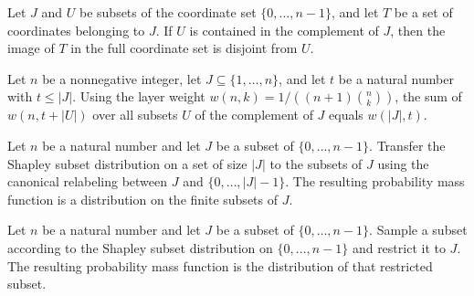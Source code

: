 \begin{theorem}
\label{FABL.disjoint_liftSubsetFrom_of_subset_compl}
\leanok
{}
Let $J$ and $U$ be subsets of the coordinate set $\{0,\ldots,n-1\}$, and let $T$ be a
set of coordinates belonging to $J$. If $U$ is contained in the complement of $J$, then
the image of $T$ in the full coordinate set is disjoint from $U$.
\end{theorem}

\begin{theorem}
\label{FABL.sum_shapleyLayerWeight_add_card_compl}
\leanok
{}
Let $n$ be a nonnegative integer, let $J\subseteq\{1,\ldots,n\}$, and let $t$ be a
natural number with $t\le |J|$. Using the layer weight $w(n,k)=1/((n+1)\binom{n}{k})$,
the sum of $w(n,t+|U|)$ over all subsets $U$ of the complement of $J$ equals $w(|J|,t)$.
\end{theorem}

\begin{definition}
\label{FABL.shapleySubsetPMFOn}
\leanok
{}
Let $n$ be a natural number and let $J$ be a subset of $\{0,\ldots,n-1\}$. Transfer the
Shapley subset distribution on a set of size $|J|$ to the subsets of $J$ using the
canonical relabeling between $J$ and $\{0,\ldots,|J|-1\}$. The resulting probability
mass function is a distribution on the finite subsets of $J$.
\end{definition}

\begin{definition}
\label{FABL.shapleySubsetMarginalPMF}
\leanok
{}
Let $n$ be a natural number and let $J$ be a subset of $\{0,\ldots,n-1\}$. Sample a
subset according to the Shapley subset distribution on $\{0,\ldots,n-1\}$ and restrict
it to $J$. The resulting probability mass function is the distribution of that
restricted subset.
\end{definition}

